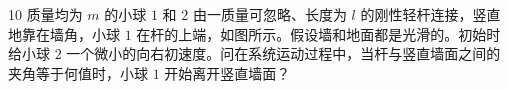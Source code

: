 \begin{problem}[第30届全国中学生物理竞赛决赛][刚性杆连接小球与墙面脱离]{10}
质量均为 $m$ 的小球 $1$ 和 $2$ 由一质量可忽略、长度为 $l$ 的刚性轻杆连接，竖直地靠在墙角，小球 $1$ 在杆的上端，如图所示。假设墙和地面都是光滑的。初始时给小球 $2$ 一个微小的向右初速度。问在系统运动过程中，当杆与竖直墙面之间的夹角等于何值时，小球 $1$ 开始离开竖直墙面？
\end{problem}